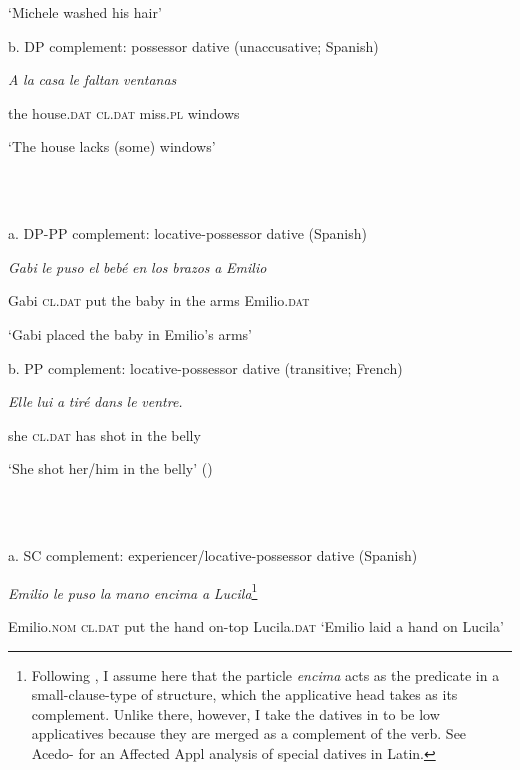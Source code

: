\documentclass[output=paper,modfonts,nonflat]{langsci/langscibook}
\begin{document}
  ‘Michele washed his hair’ 

  b.  DP complement: possessor dative (unaccusative; Spanish)

  \textit{A} \textit{la} \textit{casa}      \textit{le}     \textit{faltan}     \textit{ventanas} 

  the house.\textsc{dat} \textsc{cl.dat}   miss.\textsc{pl}  windows

  ‘The house lacks (some) windows’

\ea%
    \label{ex:key:7}
    \gll\\
        \\
    \glt
    \z

             a. DP-PP complement: locative-possessor dative (Spanish)

  \textit{Gabi}   \textit{le}         \textit{puso}   \textit{el} \textit{bebé}    \textit{en} \textit{los} \textit{brazos}   \textit{a} \textit{Emilio}

  Gabi    \textsc{cl.dat} put   the baby  in the arms    Emilio.\textsc{dat}  

  ‘Gabi placed the baby in Emilio’s arms’ 

  b. PP complement: locative-possessor dative (transitive; French)

  \textit{Elle} \textit{lui}   \textit{a} \textit{tiré}      \textit{dans} \textit{le} \textit{ventre.}

  she  \textsc{cl.dat}   has shot   in the belly

  ‘She shot her/him in the belly’   (\citealt{BonehNash2012})

\ea%
    \label{ex:key:8}
    \gll\\
        \\
    \glt
    \z

             a. SC complement: experiencer/locative-possessor dative   (Spanish)

  \textit{Emilio} \textit{le} \textit{puso} \textit{la} \textit{mano} \textit{encima} \textit{a} \textit{Lucila}\footnote{Following \citealt{Cuervo2003}, I assume here that the particle \textit{encima} acts as the predicate in a small-clause-type of structure, which the applicative head takes as its complement. Unlike there, however, I take the datives in  to be low applicatives because they are merged as a complement of the verb. See Acedo-\citet{Matellán2017} for an Affected Appl analysis of special datives in Latin.}     

  Emilio.\textsc{nom}  \textsc{cl.dat} put   the hand on-top  Lucila.\textsc{dat}    ‘Emilio laid a hand on Lucila’ 
\end{document}
